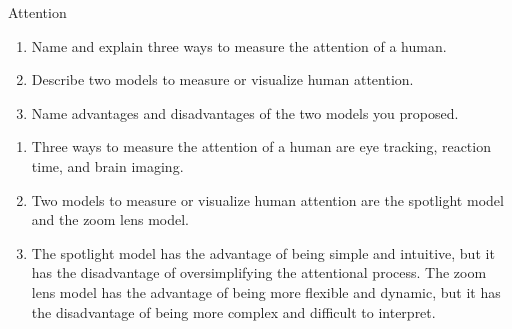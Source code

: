 \documentclass{article}
\begin{document}
\begin{exercise}{Attention}
  \begin{enumerate}
    \item Name and explain three ways to measure the attention of a human.
    \item Describe two models to measure or visualize human attention.
    \item Name advantages and disadvantages of the two models you proposed.
  \end{enumerate}

  \begin{solution}
    \begin{enumerate}
      \item Three ways to measure the attention of a human are eye tracking, reaction time, and brain imaging.
      \item Two models to measure or visualize human attention are the spotlight model and the zoom lens model.
      \item The spotlight model has the advantage of being simple and intuitive, but it has the disadvantage of oversimplifying the attentional process. The zoom lens model has the advantage of being more flexible and dynamic, but it has the disadvantage of being more complex and difficult to interpret.
    \end{enumerate}
  \end{solution}
\end{exercise}
\end{document}
